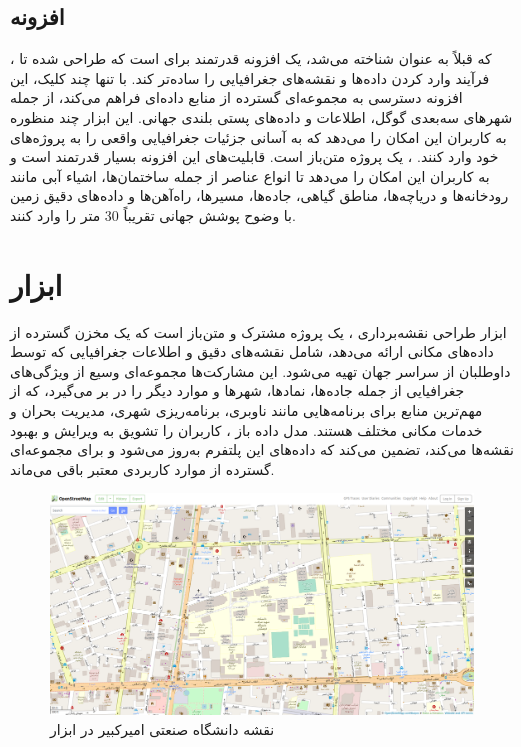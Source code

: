 \subsection{افزونه }
، که قبلاً به عنوان  شناخته می‌شد، یک افزونه قدرتمند برای  است که طراحی شده تا فرآیند وارد کردن داده‌ها و نقشه‌های جغرافیایی را ساده‌تر کند. با تنها چند کلیک، این افزونه دسترسی به مجموعه‌ای گسترده از منابع داده‌ای فراهم می‌کند، از جمله شهرهای سه‌بعدی گوگل، اطلاعات  و داده‌های پستی بلندی جهانی. این ابزار چند منظوره به کاربران این امکان را می‌دهد که به آسانی جزئیات جغرافیایی واقعی را به پروژه‌های  خود وارد کنند. ، یک پروژه متن‌باز است. قابلیت‌های این افزونه بسیار قدرتمند است و به کاربران این امکان را می‌دهد تا انواع عناصر از جمله ساختمان‌ها، اشیاء آبی مانند رودخانه‌ها و دریاچه‌ها، مناطق گیاهی، جاده‌ها، مسیرها، راه‌آهن‌ها و داده‌های دقیق زمین با وضوح پوشش جهانی تقریباً 30 متر را وارد کنند.

\section{ابزار }

ابزار طراحی نقشه‌برداری ، یک پروژه مشترک و متن‌باز است که یک مخزن گسترده از داده‌های مکانی ارائه می‌دهد، شامل نقشه‌های دقیق و اطلاعات جغرافیایی که توسط داوطلبان از سراسر جهان تهیه می‌شود. این مشارکت‌ها مجموعه‌ای وسیع از ویژگی‌های جغرافیایی از جمله جاده‌ها، نمادها، شهرها و موارد دیگر را در بر می‌گیرد، که از مهم‌ترین منابع برای برنامه‌هایی مانند ناوبری، برنامه‌ریزی شهری، مدیریت بحران و خدمات مکانی مختلف هستند. مدل داده باز ، کاربران را تشویق به ویرایش و بهبود نقشه‌ها می‌کند، تضمین می‌کند که داده‌های این پلتفرم به‌روز می‌شود و برای مجموعه‌ای گسترده از موارد کاربردی معتبر باقی می‌ماند.

\begin{figure}[h!]
    \centering
    \includegraphics[width=1\linewidth]{figures/Amirkabir_OpenStreetMap.png}
    \caption{نقشه دانشگاه صنعتی امیرکبیر در ابزار }
    \label{fig:Amirkabir_OpenStreetMap}
\end{figure}

